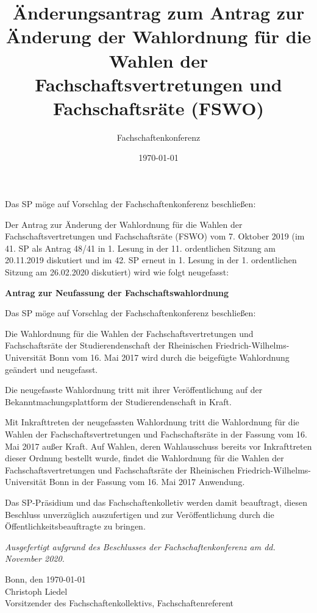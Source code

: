 \documentclass[DIV=12, parskip=half, fontsize=12pt, a4paper]{scrartcl}
\title{Änderungsantrag zum Antrag zur Änderung der Wahlordnung für die Wahlen der Fachschaftsvertretungen und Fachschaftsräte (FSWO)}
\author{Fachschaftenkonferenz}
\date{\today}
\begin{document}
	\maketitle
	Das SP möge auf Vorschlag der Fachschaftenkonferenz beschließen:

	\begin{linenumbers}
		Der Antrag zur Änderung der Wahlordnung für die Wahlen der Fachschaftsvertretungen und Fachschaftsräte (FSWO) vom 7. Oktober 2019 (im 41. SP als Antrag 48/41 in 1. Lesung in der 11. ordentlichen Sitzung am 20.11.2019 diskutiert und im 42. SP erneut in 1. Lesung in der 1. ordentlichen Sitzung am 26.02.2020 diskutiert) wird wie folgt neugefasst:

		\begin{center}\bfseries\LARGE Antrag zur Neufassung der Fachschaftswahlordnung
		\end{center}

		Das SP möge auf Vorschlag der Fachschaftenkonferenz beschließen:

		Die Wahlordnung für die Wahlen der Fachschaftsvertretungen und Fachschaftsräte der Studierendenschaft der Rheinischen Friedrich-Wilhelms-Universität Bonn vom 16. Mai 2017 wird durch die beigefügte Wahlordnung geändert und neugefasst.

		Die neugefasste Wahlordnung tritt mit ihrer Veröffentlichung auf der Bekanntmachungsplattform der Studierendenschaft in Kraft.

		Mit Inkrafttreten der neugefassten Wahlordnung tritt die Wahlordnung für die Wahlen der Fachschaftsvertretungen und Fachschaftsräte in der Fassung vom 16. Mai 2017 außer Kraft.
		Auf Wahlen, deren Wahlausschuss bereits vor Inkrafttreten dieser Ordnung bestellt wurde, findet die Wahlordnung für die Wahlen der Fachschaftsvertretungen und Fachschaftsräte der Rheinischen Friedrich-Wilhelms-Universität 	Bonn in der Fassung vom 16. Mai 2017 Anwendung.

		Das  SP-Präsidium und das Fachschaftenkolletiv  werden  damit  beauftragt,  diesen Beschluss unverzüglich auszufertigen und zur Veröffentlichung durch die Öffentlichkeitsbeauftragte zu bringen.
	\end{linenumbers}

	\vspace{1em}
	\textit{Ausgefertigt aufgrund des Beschlusses der Fachschaftenkonferenz am dd. November 2020.}

	Bonn, den \today \\
	Christoph Liedel \\
	{\scriptsize Vorsitzender des Fachschaftenkollektivs, Fachschaftenreferent}

	\clearpage
	
\end{document}
